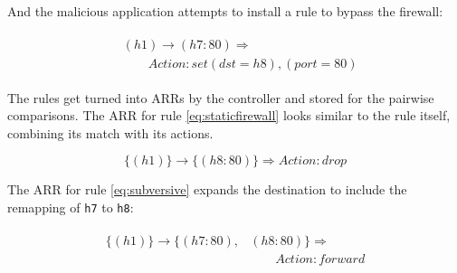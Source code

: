 And the malicious application attempts to install a rule to bypass the firewall:


\begin{align}
\begin{aligned}
\label{eq:subversive}
&(h1) \rightarrow (h7:80) \Rightarrow  \\
    &\qquad Action: set (dst = h8), (port = 80) 
\end{aligned}
\end{align}

The rules get turned into ARRs by the controller and stored for the pairwise comparisons.
The ARR for rule \ref{eq:staticfirewall} looks similar to the rule itself, combining its match with its actions.

\begin{equation}
\{(h1)\} \rightarrow \{(h8:80)\}  \Rightarrow Action: drop \nonumber
\end{equation}

The ARR for rule \ref{eq:subversive} expands the destination to include the remapping of \texttt{h7} to \texttt{h8}:

\begin{align}
\begin{aligned}
\{(h1)\} \rightarrow \{(h7:80),&(h8:80)\} \Rightarrow \\ 
     &\qquad Action: forward \nonumber
\end{aligned}
\end{align}

